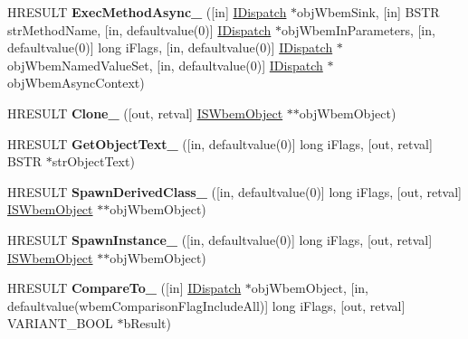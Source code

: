 \begin{DoxyCompactItemize}
\item 
\mbox{\label{interface_wbem_scripting_1_1_i_s_wbem_object_a48b923ce3082714f7b0c919aef44562a}} 
H\+R\+E\+S\+U\+LT {\bfseries Exec\+Method\+Async\+\_\+} (\mbox{[}in\mbox{]} \hyperlink{interface_i_dispatch}{I\+Dispatch} $\ast$obj\+Wbem\+Sink, \mbox{[}in\mbox{]} B\+S\+TR str\+Method\+Name, \mbox{[}in, defaultvalue(0)\mbox{]} \hyperlink{interface_i_dispatch}{I\+Dispatch} $\ast$obj\+Wbem\+In\+Parameters, \mbox{[}in, defaultvalue(0)\mbox{]} long i\+Flags, \mbox{[}in, defaultvalue(0)\mbox{]} \hyperlink{interface_i_dispatch}{I\+Dispatch} $\ast$obj\+Wbem\+Named\+Value\+Set, \mbox{[}in, defaultvalue(0)\mbox{]} \hyperlink{interface_i_dispatch}{I\+Dispatch} $\ast$obj\+Wbem\+Async\+Context)
\item 
\mbox{\label{interface_wbem_scripting_1_1_i_s_wbem_object_abb10680d09ddb91c8a5846ae925f9cfd}} 
H\+R\+E\+S\+U\+LT {\bfseries Clone\+\_\+} (\mbox{[}out, retval\mbox{]} \hyperlink{interface_wbem_scripting_1_1_i_s_wbem_object}{I\+S\+Wbem\+Object} $\ast$$\ast$obj\+Wbem\+Object)
\item 
\mbox{\label{interface_wbem_scripting_1_1_i_s_wbem_object_afa2292a7a1f7224c16262f97646928e2}} 
H\+R\+E\+S\+U\+LT {\bfseries Get\+Object\+Text\+\_\+} (\mbox{[}in, defaultvalue(0)\mbox{]} long i\+Flags, \mbox{[}out, retval\mbox{]} B\+S\+TR $\ast$str\+Object\+Text)
\item 
\mbox{\label{interface_wbem_scripting_1_1_i_s_wbem_object_a5610397a5c19ccfd6817f92c05e160cc}} 
H\+R\+E\+S\+U\+LT {\bfseries Spawn\+Derived\+Class\+\_\+} (\mbox{[}in, defaultvalue(0)\mbox{]} long i\+Flags, \mbox{[}out, retval\mbox{]} \hyperlink{interface_wbem_scripting_1_1_i_s_wbem_object}{I\+S\+Wbem\+Object} $\ast$$\ast$obj\+Wbem\+Object)
\item 
\mbox{\label{interface_wbem_scripting_1_1_i_s_wbem_object_a2974a99e08a5943fe31d3558c3c64c18}} 
H\+R\+E\+S\+U\+LT {\bfseries Spawn\+Instance\+\_\+} (\mbox{[}in, defaultvalue(0)\mbox{]} long i\+Flags, \mbox{[}out, retval\mbox{]} \hyperlink{interface_wbem_scripting_1_1_i_s_wbem_object}{I\+S\+Wbem\+Object} $\ast$$\ast$obj\+Wbem\+Object)
\item 
\mbox{\label{interface_wbem_scripting_1_1_i_s_wbem_object_aafa01d67b05c2631f4b98dd33c50cf82}} 
H\+R\+E\+S\+U\+LT {\bfseries Compare\+To\+\_\+} (\mbox{[}in\mbox{]} \hyperlink{interface_i_dispatch}{I\+Dispatch} $\ast$obj\+Wbem\+Object, \mbox{[}in, defaultvalue(wbem\+Comparison\+Flag\+Include\+All)\mbox{]} long i\+Flags, \mbox{[}out, retval\mbox{]} V\+A\+R\+I\+A\+N\+T\+\_\+\+B\+O\+OL $\ast$b\+Result)
\end{DoxyCompactItemize}
